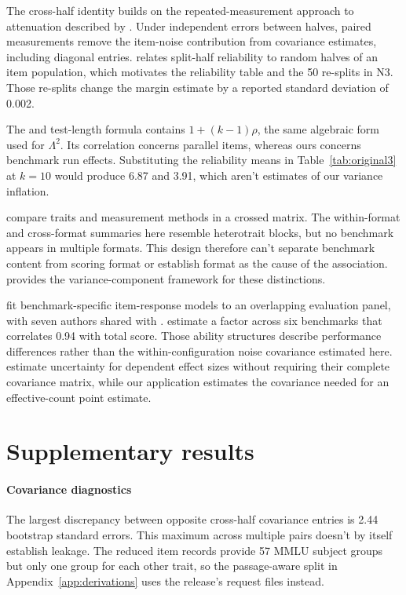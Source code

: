 The cross-half identity builds on the repeated-measurement approach to attenuation described by \citet{spearman1904}. Under independent errors between halves, paired measurements remove the item-noise contribution from covariance estimates, including diagonal entries. \citet{cronbach1951} relates split-half reliability to random halves of an item population, which motivates the reliability table and the 50 re-splits in N3. Those re-splits change the margin estimate by a reported standard deviation of 0.002.

The \citet{brown1910} and \citet{spearman1910} test-length formula contains $1+(k-1)\rho$, the same algebraic form used for $\Lambda^2$. Its correlation concerns parallel items, whereas ours concerns benchmark run effects. Substituting the reliability means in Table~\ref{tab:original3} at $k=10$ would produce 6.87 and 3.91, which aren't estimates of our variance inflation.

\citet{campbell1959} compare traits and measurement methods in a crossed matrix. The within-format and cross-format summaries here resemble heterotrait blocks, but no benchmark appears in multiple formats. This design therefore can't separate benchmark content from scoring format or establish format as the cause of the association. \citet{brennan2001} provides the variance-component framework for these distinctions.

\citet{hofmann2025} fit benchmark-specific item-response models to an overlapping evaluation panel, with seven authors shared with \citet{heineman2025}. \citet{kipnis2024} estimate a factor across six benchmarks that correlates 0.94 with total score. Those ability structures describe performance differences rather than the within-configuration noise covariance estimated here. \citet{hedges2010} estimate uncertainty for dependent effect sizes without requiring their complete covariance matrix, while our application estimates the covariance needed for an effective-count point estimate.

\section{Supplementary results}
\label{app:supplementary}

\paragraph{Covariance diagnostics}
The largest discrepancy between opposite cross-half covariance entries is 2.44 bootstrap standard errors. This maximum across multiple pairs doesn't by itself establish leakage. The reduced item records provide 57 MMLU subject groups but only one group for each other trait, so the passage-aware split in Appendix~\ref{app:derivations} uses the release's request files instead.


